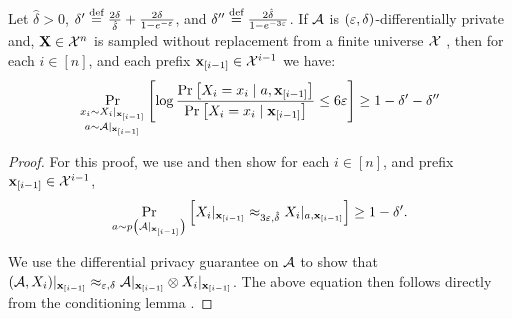 \begin{claim}
Let $\hat\delta>0$, $\delta' \stackrel{\text{def}}{=}
\tfrac{2\delta}{\hat\delta} + \tfrac{2\delta}{1-e^{-\varepsilon}}$, and $\delta'' \stackrel{\text{def}}{=} \tfrac{2\hat\delta}{1-e^{-3\varepsilon}}$.
If $\mathcal{A}$ is $(\varepsilon,\delta)$-differentially private and, $\mathbf{X} \in \mathcal{X}^n$ is sampled without replacement from a finite universe $\mathcal{X}$ , then for each $i \in [n]$, and each prefix $\mathbf{x}_{[i-1]}\in \mathcal{X}^{i-1}$ we have:
    $$
    \operatorname*{\mathrm{Pr}}_{\substack{x_i \sim X_i |_{\mathbf{x}_{[i-1]}}\\
    a \sim \mathcal{A}|_{\mathbf{x}_{[i-1]}}}}\left[\log\dfrac{\operatorname*{\mathrm{Pr}}_{}\left[X_i = x_i \mid  a, \mathbf{x}_{[i-1]}\right]}{\operatorname*{\mathrm{Pr}}_{}\left[X_i = x_i\mid  \mathbf{x}_{[i-1]}\right]} \leq 6 \varepsilon \right] \geq 1- \delta' - \delta''
    $$
\label{claim:Gi}
\end{claim}

\begin{proof}
For this proof, we use  and then show for each $i \in [n]$, and prefix $\mathbf{x}_{[i-1]}\in \mathcal{X}^{i-1}$,
$$
   \operatorname*{\mathrm{Pr}}_{a \sim p\left( \mathcal{A}|_{\mathbf{x}_{[i-1]}}\right) }\left[X_i|_{\mathbf{x}_{[i-1]}} \approx_{3\varepsilon,\hat{\delta}} X_i|_{a, \mathbf{x}_{[i-1]}}\right] \geq 1-\delta'. 
$$

We use the differential privacy guarantee on $\mathcal{A}$ to show that $(\mathcal{A},X_i)|_{\mathbf{x}_{[i-1]}} \approx_{\varepsilon,\delta} \mathcal{A}|_{\mathbf{x}_{[i-1]}} \otimes {\color{black}X_i|_{\mathbf{x}_{[i-1]}}}$. The above equation then follows directly from the conditioning lemma .


\end{proof}
